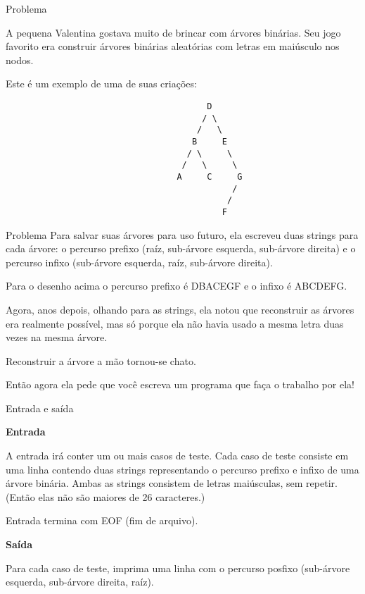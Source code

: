 
\begin{frame}[fragile]{Problema}

A pequena Valentina gostava muito de brincar com árvores binárias. Seu jogo favorito era construir árvores binárias aleatórias com letras em maiúsculo nos nodos.

Este é um exemplo de uma de suas criações:
 
\begin{verbatim}
                                        D
                                       / \
                                      /   \
                                     B     E
                                    / \     \
                                   /   \     \
                                  A     C     G
                                             /
                                            /
                                           F
\end{verbatim}
\end{frame}
 

\begin{frame}[fragile]{Problema}
Para salvar suas árvores para uso futuro, ela escreveu duas strings para cada árvore: o percurso prefixo (raíz, sub-árvore esquerda, sub-árvore direita) e o percurso infixo (sub-árvore esquerda, raíz, sub-árvore direita).

Para o desenho acima o percurso prefixo é DBACEGF e o infixo é ABCDEFG.

Agora, anos depois, olhando para as strings, ela notou que reconstruir as árvores era realmente possível, mas só porque ela não havia usado a mesma letra duas vezes na mesma árvore.

Reconstruir a árvore a mão tornou-se chato.

Então agora ela pede que você escreva um programa que faça o trabalho por ela!

\end{frame}

\begin{frame}[fragile]{Entrada e saída}

\textbf{Entrada}

A entrada irá conter um ou mais casos de teste. Cada caso de teste consiste em uma linha contendo duas strings representando o percurso prefixo e infixo de uma árvore binária. Ambas as strings consistem de letras maiúsculas, sem repetir. (Então elas não são maiores de 26 caracteres.)

Entrada termina com EOF (fim de arquivo).

\vspace{0.2in}

\textbf{Saída}

Para cada caso de teste, imprima uma linha com o percurso posfixo (sub-árvore esquerda, sub-árvore direita, raíz).

\end{frame}



